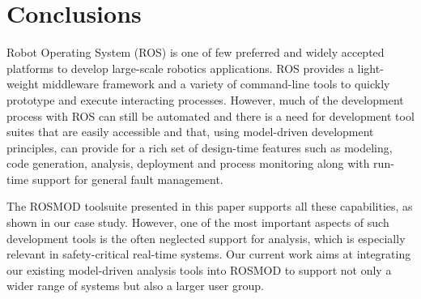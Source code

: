 \section{Conclusions}
\label{sec:Conclusions}

Robot Operating System (ROS) is one of few preferred and widely accepted platforms to develop large-scale robotics applications. ROS provides a light-weight middleware framework and a variety of command-line tools to quickly prototype and execute interacting processes. However, much of the development process with ROS can still be automated and there is a need for development tool suites that are easily accessible and that, using model-driven development principles, can provide for a rich set of design-time features such as modeling, code generation, analysis, deployment and process monitoring along with run-time support for general fault management. 

The ROSMOD toolsuite presented in this paper supports all these capabilities, as shown in our case study. However, one of the most important aspects of such development tools is the often neglected support for analysis, which is especially relevant in safety-critical real-time systems. Our current work aims at integrating our existing model-driven analysis tools into ROSMOD to support not only a wider range of systems but also a larger user group.

 
 